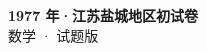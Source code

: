 \documentclass[zihao=-4, a4paper]{ctexart}
\begin{document}
\begin{center}
  {\Large\bfseries 1977 年·江苏盐城地区初试卷}\\[4pt]
  {\large 数学 · 试题版}
\end{center}
\medskip
{}

\end{document}
